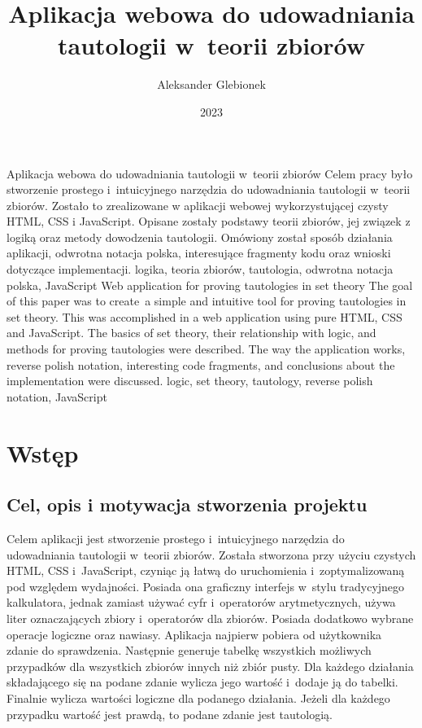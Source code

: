 \documentclass{SGGW-thesis}
\title{Aplikacja webowa do udowadniania tautologii w~teorii
zbiorów}
\author{Aleksander Glebionek}
\date{2023}
\begin{document}
\maketitle
\statementpage
\abstractpage
{Aplikacja webowa do udowadniania tautologii w~teorii
zbiorów}
{Celem pracy było stworzenie prostego i~intuicyjnego narzędzia do udowadniania tautologii w~teorii zbiorów. Zostało to zrealizowane w aplikacji webowej wykorzystującej czysty HTML, CSS i JavaScript. Opisane zostały podstawy teorii zbiorów, jej związek z logiką oraz metody dowodzenia tautologii. Omówiony został sposób działania aplikacji, odwrotna notacja polska, interesujące fragmenty kodu oraz wnioski dotyczące implementacji.}
{logika, teoria zbiorów, tautologia, odwrotna notacja polska, JavaScript}
{Web application for proving tautologies in set theory}
{The goal of this paper was to create~a simple and intuitive tool for proving tautologies in set theory. This was accomplished in a web application using pure HTML, CSS and JavaScript. The basics of set theory, their relationship with logic, and methods for proving tautologies were described. The way the application works, reverse polish notation, interesting code fragments, and conclusions about the implementation were discussed.}
{logic, set theory, tautology, reverse polish notation, JavaScript}

\tableofcontents

\startchapterfromoddpage

\chapter{Wstęp}

\section{Cel, opis i motywacja stworzenia projektu\label{sec:1.1}}
\begin{paragraph}{}
    Celem aplikacji jest stworzenie prostego i~intuicyjnego narzędzia do udowadniania tautologii w~teorii zbiorów. Została stworzona przy użyciu czystych HTML, CSS i~JavaScript, czyniąc ją łatwą do uruchomienia i~zoptymalizowaną pod względem wydajności. Posiada ona graficzny interfejs w~stylu tradycyjnego kalkulatora, jednak zamiast używać cyfr i~operatorów arytmetycznych, używa liter oznaczających zbiory i~operatorów dla zbiorów. Posiada dodatkowo wybrane operacje logiczne oraz nawiasy.
    Aplikacja najpierw pobiera od użytkownika zdanie do sprawdzenia. Następnie generuje tabelkę wszystkich możliwych przypadków dla wszystkich zbiorów innych niż zbiór pusty. Dla każdego działania składającego się na podane zdanie wylicza jego wartość i~dodaje ją do tabelki. Finalnie wylicza wartości logiczne dla podanego działania. Jeżeli dla każdego przypadku wartość jest prawdą, to podane zdanie jest tautologią.
\end{paragraph}
\end{document}
